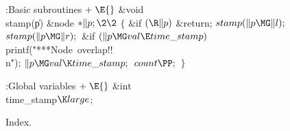 \B{}:Basic subroutines\X${}\mathrel+\E{}$\6
\&{void} \\{stamp}(\|p)\1\1\6
\&{node} ${}{*}\|p;\2\2{}$\6
${}\{{}$\1\6
\&{if} ${}(\R\|p){}$\1\5
\&{return};\2\6
${}\\{stamp}(\|p\MG\|l);{}$\6
${}\\{stamp}(\|p\MG\|r);{}$\6
\&{if} ${}(\|p\MG\\{val}\E\\{time\_stamp}){}$\1\5
\\{printf}(\.{"***Node\ overlap!!\\n}\)\.{"});\2\6
${}\|p\MG\\{val}\K\\{time\_stamp};{}$\6
${}\\{count}\PP;{}$\6
\4${}\}{}$\2\par
\fi

\B{}:Global variables\X${}\mathrel+\E{}$\6
\&{int} \\{time\_stamp}${}\K\\{large}{}$;\par
\fi

Index.
\fi

\inx
\fin
\con
